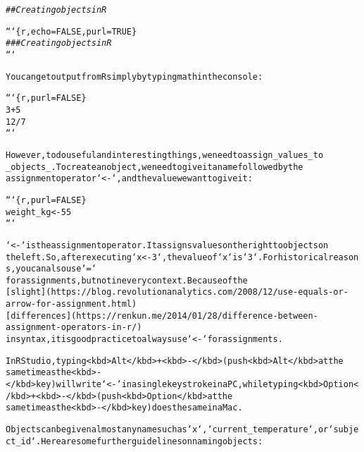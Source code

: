 \documentclass{article}\usepackage[]{graphicx}\usepackage[]{xcolor}
\makeatletter
\newcommand{\hlcom}[1]{\textcolor[rgb]{0.678,0.584,0.686}{\textit{#1}}}%
\newenvironment{kframe}{%
 \def\at@end@of@kframe{}%
 \ifinner\ifhmode%
  \def\at@end@of@kframe{\end{minipage}}%
  \begin{minipage}{\columnwidth}%
 \fi\fi%
 \def\FrameCommand##1{\hskip\@totalleftmargin \hskip-\fboxsep
 \colorbox{shadecolor}{##1}\hskip-\fboxsep
     \hskip-\linewidth \hskip-\@totalleftmargin \hskip\columnwidth}%
 \MakeFramed {\advance\hsize-\width
   \@totalleftmargin\z@ \linewidth\hsize
   \@setminipage}}%
 {\par\unskip\endMakeFramed%
 \at@end@of@kframe}
\newenvironment{knitrout}{}{} %
\makeatother
\begin{document}
\begin{knitrout}
\color{fgcolor}\begin{kframe}
\begin{alltt}

\hlcom{## Creating objects in R}

```\{r, echo = FALSE, purl = TRUE\}
\hlcom{### Creating objects in R}
```

You can get output from R simply by typing math in the console:

```\{r, purl = FALSE\}
3 + 5
12 / 7
```

However, to do useful and interesting things, we need to assign _values_ to
_objects_. To create an object, we need to give it a name followed by the
assignment operator `<-`, and the value we want to give it:

```\{r, purl = FALSE\}
weight_kg <- 55
```

`<-` is the assignment operator. It assigns values on the right to objects on
the left. So, after executing `x <- 3`, the value of `x` is `3`.   For historical reasons, you can also use `=`
for assignments, but not in every context. Because of the
[slight](https://blog.revolutionanalytics.com/2008/12/use-equals-or-arrow-for-assignment.html)
[differences](https://renkun.me/2014/01/28/difference-between-assignment-operators-in-r/)
in syntax, it is good practice to always use `<-` for assignments.

In RStudio, typing <kbd>Alt</kbd> + <kbd>-</kbd> (push <kbd>Alt</kbd> at the
same time as the <kbd>-</kbd> key) will write ` <- ` in a single keystroke in a PC, while typing <kbd>Option</kbd> + <kbd>-</kbd> (push <kbd>Option</kbd> at the
same time as the <kbd>-</kbd> key) does the same in a Mac.

Objects can be given almost any name such as `x`, `current_temperature`, or `subject_id`. Here are some further guidelines on naming objects:


\end{alltt}
\end{kframe}
\end{knitrout}
\end{document}
